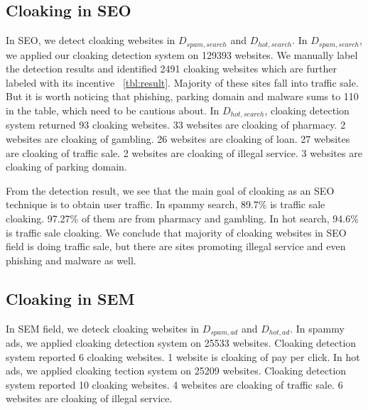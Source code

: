 \subsection{Cloaking in SEO}
In SEO, we detect cloaking websites in $D_{spam, search}$ and $D_{hot,
search}$. In $D_{spam, search}$, we applied our cloaking detection system 
on 129393 websites. We manually label
the detection results and identified 2491 cloaking websites which are further
labeled with its incentive ~\autoref{tbl:result}. Majority of these sites fall into traffic sale. 
But it is worth noticing that phishing, parking domain and malware sums to 110
in the table, which need to be cautious about.
In $D_{hot, search}$, cloaking detection system returned 93
cloaking websites. 33 websites are cloaking of pharmacy. 2 websites are cloaking of gambling.
26 websites are cloaking of loan. 27 websites are cloaking of traffic sale. 
2 websites are cloaking of illegal service. 3 websites are cloaking of parking domain.

From the detection result, we see that the main goal of cloaking as an SEO 
technique is to obtain user traffic.
In spammy search, 89.7\% is traffic sale cloaking. 97.27\% of them are from
pharmacy and gambling. 
In hot search, 94.6\% is traffic sale cloaking. 
We conclude that majority of cloaking websites in SEO field is doing traffic
sale, but there are sites promoting illegal service and even phishing and
malware as well.


%
%
%


\subsection{Cloaking in SEM}

In SEM field, we deteck cloaking websites in $D_{spam, ad}$ and $D_{hot, ad}$. In spammy ads,
we applied cloaking detection system on 25533 websites. Cloaking detection system reported 6 cloaking websites.
1 website is cloaking of pay per click. In hot ads, we applied cloaking tection system on 25209 websites.
Cloaking detection system reported 10 cloaking websites. 4 websites are cloaking of traffic sale.
6 websites are cloaking of illegal service. 


